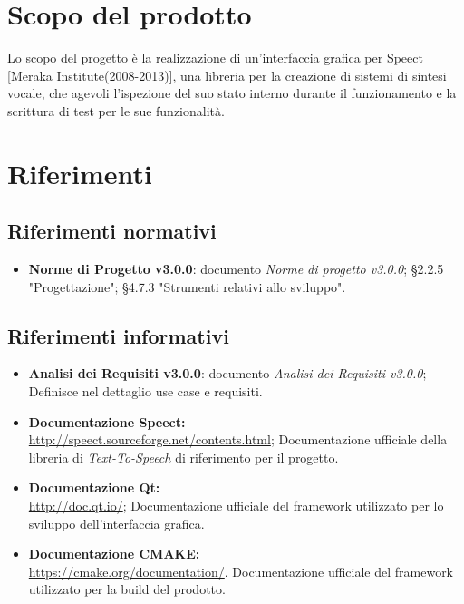 \documentclass[openany,12pt,a4paper]{report}
\begin{document}
	\section{Scopo del prodotto}
	
	Lo scopo del progetto è la realizzazione di un’interfaccia grafica per Speect [Meraka Institute(2008-2013)], una libreria per la creazione di sistemi di sintesi vocale, che agevoli l’ispezione del suo stato interno durante il funzionamento e la scrittura di test per le sue funzionalità.

	\section{Riferimenti}
	
	\subsection*{Riferimenti normativi}
	
	\begin{itemize}
		\item \textbf{Norme di Progetto v3.0.0}: documento \textit{Norme di progetto v3.0.0};
		\subitem §2.2.5 "Progettazione";
		\subitem §4.7.3 "Strumenti relativi allo sviluppo".
	\end{itemize}
	
	\subsection*{Riferimenti informativi}
	
	\begin{itemize}
		\item \textbf{Analisi dei Requisiti v3.0.0}: documento \textit{Analisi dei Requisiti v3.0.0};
		\subitem Definisce nel dettaglio use case e requisiti.
		
		\item \textbf{Documentazione Speect:} \\
		\url{http://speect.sourceforge.net/contents.html};
		\subitem Documentazione ufficiale della libreria di \textit{Text-To-Speech} di riferimento per il progetto.
		
		\item \textbf{Documentazione Qt:} \\
		\url{http://doc.qt.io/};
		\subitem Documentazione ufficiale del framework utilizzato per lo sviluppo dell'interfaccia grafica.
		
		\item \textbf{Documentazione CMAKE:} \\
		\url{https://cmake.org/documentation/}.
		\subitem Documentazione ufficiale del framework utilizzato per la build del prodotto. 
	\end{itemize}
\end{document}
